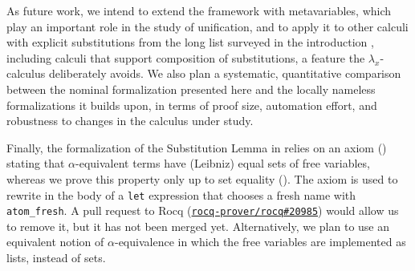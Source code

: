 \documentclass[runningheads]{llncs}
\begin{document}
As future work, we intend to extend the framework with metavariables, which play an important role in the study of unification, and to apply it to other calculi with explicit substitutions from the long list surveyed in the introduction \cite{abadiExplicitSubstitutions1991,roseExplicitSubstitutionNames2011,benaissaLnCalculusExplicit1996,curienConfluencePropertiesWeak1996,munozConfluencePreservationStrong1996,kamareddineExtendingLcalculusExplicit1997a,blooExplicitSubstitutionEdge1999,davidLambdacalculusExplicitWeakening2001,kesnerTheoryExplicitSubstitutions2009a}, including calculi that support composition of substitutions, a feature the $\lambda_x$-calculus deliberately avoids. We also plan a systematic, quantitative comparison between the nominal formalization presented here and the locally nameless formalizations \cite{chargueraudLocallyNamelessRepresentation2011} it builds upon, in terms of proof size, automation effort, and robustness to changes in the calculus under study.

Finally, the formalization of the Substitution Lemma in \cite{limaFormalizedExtensionSubstitution2023} relies on an axiom () stating that $\alpha$-equivalent terms have (Leibniz) equal sets of free variables, whereas we prove this property only up to set equality (). The axiom is used to rewrite in the body of a \texttt{let} expression that chooses a fresh name with \texttt{atom\_fresh}. A pull request to Rocq (\href{https://github.com/rocq-prover/rocq/pull/20985}{\texttt{rocq-prover/rocq\#20985}}) would allow us to remove it, but it has not been merged yet. Alternatively, we plan to use an equivalent notion of $\alpha$-equivalence in which the free variables are implemented as lists, instead of sets.


 
\end{document}
